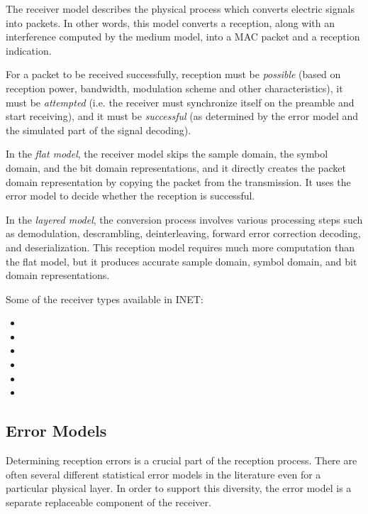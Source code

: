 The receiver model describes the physical process which converts electric
signals into packets. In other words, this model converts a reception, along
with an interference computed by the medium model, into a MAC packet and a
reception indication.

For a packet to be received successfully, reception must be \textit{possible}
(based on reception power, bandwidth, modulation scheme and other characteristics),
it must be \textit{attempted} (i.e. the receiver must synchronize itself on
the preamble and start receiving), and it must be \textit{successful}
(as determined by the error model and the simulated part of the signal decoding).

In the \textit{flat model}, the receiver model skips the sample domain, the symbol domain,
and the bit domain representations, and it directly creates the packet domain
representation by copying the packet from the transmission. It uses the error
model to decide whether the reception is successful.

In the \textit{layered model}, the conversion process involves various processing steps
such as demodulation, descrambling, deinterleaving, forward error correction
decoding, and deserialization. This reception model requires much more
computation than the flat model, but it produces accurate sample domain,
symbol domain, and bit domain representations.

Some of the receiver types available in INET:

\begin{itemize}
  \item {}
  \item {}
  \item {}
  \item {}
  \item {}
  \item {}
\end{itemize}


\subsection{Error Models}
\label{sec:phy:error-models}

Determining reception errors is a crucial part of the reception process.
There are often several different statistical error models in the literature
even for a particular physical layer. In order to support this diversity, the
error model is a separate replaceable component of the receiver.

